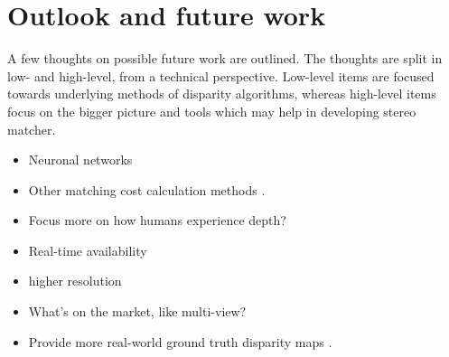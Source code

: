 \section{Outlook and future work}

A few thoughts on possible future work are outlined.
The thoughts are split in low- and high-level, from a technical perspective.
Low-level items are focused towards underlying methods of disparity algorithms, whereas high-level items focus on the bigger picture and tools which may help in developing stereo matcher.

\begin{itemize}
  \item Neuronal networks \citep{olshausen1996emergence}
  \item Other matching cost calculation methods \citep{hermann2010gradient}.
  \item Focus more on how humans experience depth? \citep{deangelis1995neuronal}
\end{itemize}

\begin{itemize}
  \item Real-time availability
  \item higher resolution
  \item What's on the market, like multi-view?
  \item Provide more real-world ground truth disparity maps \citep{kondermann2015stereo, Geiger2011IV}.
\end{itemize}
